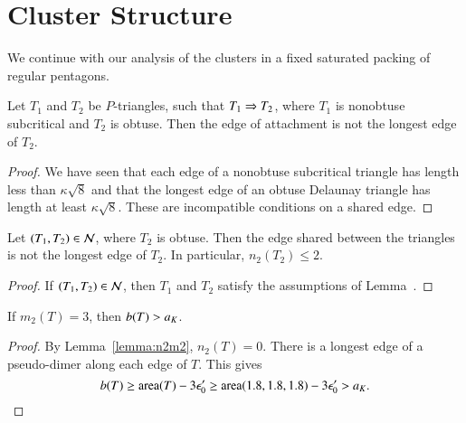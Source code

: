 \section{Cluster Structure}





We continue with our analysis of the clusters in a fixed saturated
packing of regular pentagons.  

\begin{lemma}  
Let $T_1$ and $T_2$ be $P$-triangles, such that $T_1\Rightarrow T_2$, where $T_1$ is nonobtuse subcritical and
  $T_2$ is obtuse.  Then the edge of attachment is not the longest
  edge of $T_2$.
\end{lemma}

\begin{proof} We have seen that each edge of a nonobtuse subcritical
  triangle has length less than $\kappa\sqrt8$ and that the longest edge of an
  obtuse Delaunay triangle has length at least $\kappa\sqrt{8}$.  These are
  incompatible conditions on a shared edge.
\end{proof}

\begin{lemma}  
  Let $(T_1,T_2)\in\mathcal N$, where $T_2$ is obtuse.  Then the edge shared between the triangles is
  not the longest edge of $T_2$.  In particular, $n_2(T_2)\le 2$.
\end{lemma}

\begin{proof} If $(T_1,T_2)\in \mathcal N$, then $T_1$ and $T_2$ satisfy the
  assumptions of Lemma~.
\end{proof}

\begin{lemma}\label{lemma:3m2} 
If $m_2(T) = 3$, then $b(T) > a_K$.
\end{lemma}

\begin{proof}  By Lemma~\ref{lemma:n2m2}, $n_2(T)=0$.
There is a longest edge of a pseudo-dimer along each edge of $T$.
This gives
\[
b(T) \ge {\operatorname{area}}(T) - 3\epsilon_0' \ge {\operatorname{area}}(1.8,1.8,1.8) - 3\epsilon_0' > a_K.
\]
\end{proof}

